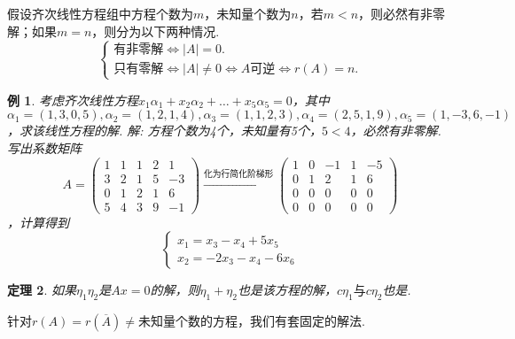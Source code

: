 \documentclass[12pt, a4paper, oneside]{ctexbook}
\newtheorem{theorem}{定理}[section]
\newtheorem{example}[theorem]{例}
\begin{document}
假设齐次线性方程组中方程个数为$m$，未知量个数为$n$，若$m < n$，则必然有非零解；如果$m = n$，则分为以下两种情况.
$$\begin{cases}
    \mbox{有非零解} \Leftrightarrow \left | A \right | = 0. \\
    \mbox{只有零解} \Leftrightarrow \left | A \right | \neq 0 \Leftrightarrow A \mbox{可逆} \Leftrightarrow r(A) = n.
\end{cases}$$

\begin{example}
    考虑齐次线性方程$x_1\alpha_1 + x_2\alpha_2 + \dots + x_5\alpha_5 = 0$，其中$\alpha_1 = (1,3,0,5), \alpha_2=(1,2,1,4), \alpha_3=(1,1,2,3), \alpha_4=(2,5,1,9), \alpha_5=(1,-3,6,-1)$，求该线性方程的解.
    \newline
    解: 方程个数为4个，未知量有5个，$5 < 4$，必然有非零解. 写出系数矩阵$$A=\begin{pmatrix}
        1 & 1 & 1 & 2 & 1 \\
        3 & 2 & 1 & 5 & -3 \\
        0 & 1 & 2 & 1 & 6 \\
        5 & 4 & 3 & 9 & -1
    \end{pmatrix} \xrightarrow{化为行简化阶梯形} \begin{pmatrix}
        1 & 0 & -1 & 1 & -5 \\
        0 & 1 & 2 & 1 & 6 \\
        0 & 0 & 0 & 0 & 0 \\
        0 & 0 & 0 & 0 & 0
    \end{pmatrix}$$，计算得到$$\begin{cases}
        x_1 = x_3 - x_4 + 5x_5 \\
        x_2 = -2x_3 - x_4 -6x_6
    \end{cases}$$
\end{example}

\begin{theorem}
    如果$\eta_1 \eta_2$是$Ax = 0$的解，则$\eta_1 + \eta_2$也是该方程的解，$c\eta_1 \mbox{与} c\eta_2$也是. 
\end{theorem}

针对$r(A) = r(\overline{A}) \neq \mbox{未知量个数}$的方程，我们有套固定的解法.
\end{document}
